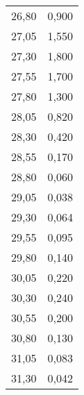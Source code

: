 \begin{table}[H]
\begin{tabular}[t]{ c c }
    26,80 & 0,900 \\
    27,05 & 1,550 \\
    27,30 & 1,800 \\
    27,55 & 1,700 \\
    27,80 & 1,300 \\
    28,05 & 0,820 \\
    28,30 & 0,420 \\
    28,55 & 0,170 \\
    28,80 & 0,060 \\
    29,05 & 0,038 \\
    29,30 & 0,064 \\
    29,55 & 0,095 \\
    29,80 & 0,140 \\
    30,05 & 0,220 \\
    30,30 & 0,240 \\
    30,55 & 0,200 \\
    30,80 & 0,130 \\
    31,05 & 0,083 \\
    31,30 & 0,042 \\
    \bottomrule
  \end{tabular}
\end{table}
